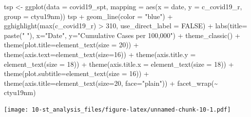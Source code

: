 \documentclass[
]{book}
\newenvironment{Shaded}{\begin{snugshade}}{\end{snugshade}}
\newcommand{\AttributeTok}[1]{\textcolor[rgb]{0.77,0.63,0.00}{#1}}
\newcommand{\ConstantTok}[1]{\textcolor[rgb]{0.00,0.00,0.00}{#1}}
\newcommand{\DecValTok}[1]{\textcolor[rgb]{0.00,0.00,0.81}{#1}}
\newcommand{\FunctionTok}[1]{\textcolor[rgb]{0.00,0.00,0.00}{#1}}
\newcommand{\NormalTok}[1]{#1}
\newcommand{\OtherTok}[1]{\textcolor[rgb]{0.56,0.35,0.01}{#1}}
\newcommand{\SpecialCharTok}[1]{\textcolor[rgb]{0.00,0.00,0.00}{#1}}
\newcommand{\StringTok}[1]{\textcolor[rgb]{0.31,0.60,0.02}{#1}}
\begin{document}
\begin{Shaded}
\begin{Highlighting}[]
\NormalTok{tsp }\OtherTok{\textless{}{-}} \FunctionTok{ggplot}\NormalTok{(}\AttributeTok{data =}\NormalTok{ covid19\_spt,}
            \AttributeTok{mapping =} \FunctionTok{aes}\NormalTok{(}\AttributeTok{x =}\NormalTok{ date, }\AttributeTok{y =}\NormalTok{ c\_covid19\_r,}
                          \AttributeTok{group =}\NormalTok{ ctyu19nm))}
\NormalTok{tsp }\SpecialCharTok{+} \FunctionTok{geom\_line}\NormalTok{(}\AttributeTok{color =} \StringTok{"blue"}\NormalTok{) }\SpecialCharTok{+} 
    \FunctionTok{gghighlight}\NormalTok{(}\FunctionTok{max}\NormalTok{(c\_covid19\_r) }\SpecialCharTok{\textgreater{}} \DecValTok{310}\NormalTok{, }\AttributeTok{use\_direct\_label =} \ConstantTok{FALSE}\NormalTok{) }\SpecialCharTok{+}
    \FunctionTok{labs}\NormalTok{(}\AttributeTok{title=} \FunctionTok{paste}\NormalTok{(}\StringTok{" "}\NormalTok{), }\AttributeTok{x=}\StringTok{"Date"}\NormalTok{, }\AttributeTok{y=}\StringTok{"Cumulative Cases per 100,000"}\NormalTok{) }\SpecialCharTok{+}
    \FunctionTok{theme\_classic}\NormalTok{() }\SpecialCharTok{+}
    \FunctionTok{theme}\NormalTok{(}\AttributeTok{plot.title=}\FunctionTok{element\_text}\NormalTok{(}\AttributeTok{size =} \DecValTok{20}\NormalTok{)) }\SpecialCharTok{+}
    \FunctionTok{theme}\NormalTok{(}\AttributeTok{axis.text=}\FunctionTok{element\_text}\NormalTok{(}\AttributeTok{size=}\DecValTok{16}\NormalTok{)) }\SpecialCharTok{+}
    \FunctionTok{theme}\NormalTok{(}\AttributeTok{axis.title.y =} \FunctionTok{element\_text}\NormalTok{(}\AttributeTok{size =} \DecValTok{18}\NormalTok{)) }\SpecialCharTok{+}
    \FunctionTok{theme}\NormalTok{(}\AttributeTok{axis.title.x =} \FunctionTok{element\_text}\NormalTok{(}\AttributeTok{size =} \DecValTok{18}\NormalTok{)) }\SpecialCharTok{+}
    \FunctionTok{theme}\NormalTok{(}\AttributeTok{plot.subtitle=}\FunctionTok{element\_text}\NormalTok{(}\AttributeTok{size =} \DecValTok{16}\NormalTok{)) }\SpecialCharTok{+}
    \FunctionTok{theme}\NormalTok{(}\AttributeTok{axis.title=}\FunctionTok{element\_text}\NormalTok{(}\AttributeTok{size=}\DecValTok{20}\NormalTok{, }\AttributeTok{face=}\StringTok{"plain"}\NormalTok{)) }\SpecialCharTok{+}
    \FunctionTok{facet\_wrap}\NormalTok{(}\SpecialCharTok{\textasciitilde{}}\NormalTok{ ctyu19nm)}
\end{Highlighting}
\end{Shaded}

\texttt{[image: 10-st\_analysis\_files/figure-latex/unnamed-chunk-10-1.pdf]}
\end{document}

